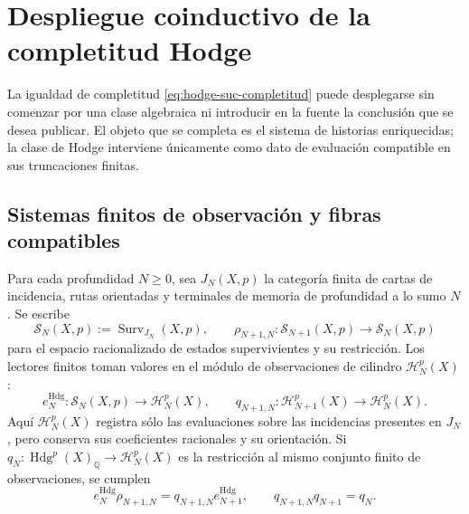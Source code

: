 
\section{Despliegue coinductivo de la completitud Hodge}
\label{sec:amp-hodge-completitud-desplegada}

La igualdad de completitud
\eqref{eq:hodge-suc-completitud} puede desplegarse sin comenzar por una clase
algebraica ni introducir en la fuente la conclusión que se desea publicar. El
objeto que se completa es el sistema de historias enriquecidas; la clase de
Hodge interviene únicamente como dato de evaluación compatible en sus
truncaciones finitas.

\subsection{Sistemas finitos de observación y fibras compatibles}
\label{subsec:amp-hodge-sistemas-finitos}

Para cada profundidad \(N\geq0\), sea \(J_N(X,p)\) la categoría finita de
cartas de incidencia, rutas orientadas y terminales de memoria de profundidad a
lo sumo \(N\). Se escribe
\begin{equation}\label{eq:amp-hodge-surv-n}
 \mathscr S_N(X,p):=\operatorname{Surv}_{J_N}(X,p),
 \qquad
 \rho_{N+1,N}:\mathscr S_{N+1}(X,p)\longrightarrow\mathscr S_N(X,p)
\end{equation}
para el espacio racionalizado de estados supervivientes y su restricción. Los
lectores finitos toman valores en el módulo de observaciones de cilindro
\(\mathscr H_N^p(X)\):
\begin{equation}\label{eq:amp-hodge-evaluacion-finita}
 e_N^{\mathrm{Hdg}}:\mathscr S_N(X,p)\longrightarrow
 \mathscr H_N^p(X),
 \qquad
 q_{N+1,N}:\mathscr H_{N+1}^p(X)\longrightarrow\mathscr H_N^p(X).
\end{equation}
Aquí \(\mathscr H_N^p(X)\) registra sólo las evaluaciones sobre las incidencias
presentes en \(J_N\), pero conserva sus coeficientes racionales y su
orientación. Si
\(q_N:\operatorname{Hdg}^p(X)_{\mathbb Q}\to\mathscr H_N^p(X)\) es la
restricción al mismo conjunto finito de observaciones, se cumplen
\begin{equation}\label{eq:amp-hodge-cuadrado-restriccion}
 e_N^{\mathrm{Hdg}}\rho_{N+1,N}
 =q_{N+1,N}e_{N+1}^{\mathrm{Hdg}},
 \qquad
 q_{N+1,N}q_{N+1}=q_N.
\end{equation}

